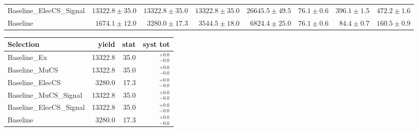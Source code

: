 \begin{tabular}{lrrrrrrr}
       Baseline\_ElecCS\_Signal &                       $13322.8\pm35.0$&                       $13322.8\pm35.0$&                         $13322.8\pm35.0$&              $26645.5\pm49.5$&                                                                                   $76.1\pm0.6$&                                                                                    $396.1\pm1.5$&           $472.2\pm1.6$ \\ 
                       Baseline &                        $1674.1\pm12.0$&                        $3280.0\pm17.3$&                          $3544.5\pm18.0$&               $6824.4\pm25.0$&                                                                                   $76.1\pm0.6$&                                                                                     $84.4\pm0.7$&           $160.5\pm0.9$ \\ 
\bottomrule 
\end{tabular}









\begin{tabular}{l|rrr}
\toprule
                 Selection & yield & stat & syst tot   \\ 
\midrule
              Baseline\_Ex & 13322.8 & 35.0 & ${}^{+0.0}_{-0.0}$ \\
            Baseline\_MuCS & 13322.8 & 35.0 & ${}^{+0.0}_{-0.0}$ \\
          Baseline\_ElecCS & 3280.0 & 17.3 & ${}^{+0.0}_{-0.0}$ \\
    Baseline\_MuCS\_Signal & 13322.8 & 35.0 & ${}^{+0.0}_{-0.0}$ \\
  Baseline\_ElecCS\_Signal & 13322.8 & 35.0 & ${}^{+0.0}_{-0.0}$ \\
                  Baseline & 3280.0 & 17.3 & ${}^{+0.0}_{-0.0}$ \\
\bottomrule
\end{tabular}



